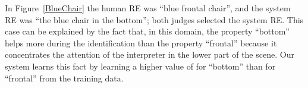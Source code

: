 In Figure~\ref{BlueChair} the human RE was ``blue frontal chair'', and the system RE was ``the blue chair in the bottom''; both judges selected the system RE. This case can be explained by the fact that, in this domain, the property ``bottom'' helps more during the identification than the property ``frontal'' because it concentrates the attention of the interpreter in the lower part of the scene. Our system learns this fact by learning a higher value of \puse for ``bottom'' than for ``frontal'' from the training data. 



